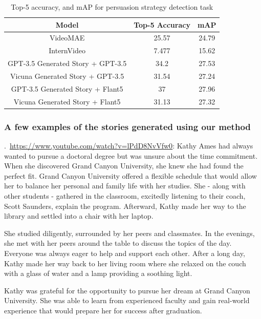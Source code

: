 \documentclass[hidelinks,11pt,a4paper]{report}
\begin{document}
\begin{table}[!h]
\centering
\begin{adjustbox}{max width=0.8\textwidth}
\begin{tabular}{ccc}
\toprule
Model & Top-5 Accuracy & mAP \\
\midrule
VideoMAE & 25.57 & 24.79 \\
InternVideo & 7.477 & 15.62 \\
GPT-3.5 Generated Story + GPT-3.5 & 34.2 & 27.53 \\
Vicuna Generated Story + GPT-3.5 & 31.54 & 27.24 \\
GPT-3.5 Generated Story + Flant5 & 37 & 27.96 \\
Vicuna Generated Story + Flant5 & 31.13 & 27.32 \\
\bottomrule
\end{tabular}
\end{adjustbox}
\caption{Top-5 accuracy, and mAP for persuasion strategy detection task}
\end{table}





\subsubsection{A few examples of the stories generated using our method}
\label{sec:examples-stories-generated}
    .~\url{https://www.youtube.com/watch?v=lPdD8NvVfw0}: 
    Kathy Ames had always wanted to pursue a doctoral degree but was unsure about the time commitment. When she discovered Grand Canyon University, she knew she had found the perfect fit. Grand Canyon University offered a flexible schedule that would allow her to balance her personal and family life with her studies. She - along with other students - gathered in the classroom, excitedly listening to their coach, Scott Saunders, explain the program. Afterward, Kathy made her way to the library and settled into a chair with her laptop. 
    
    She studied diligently, surrounded by her peers and classmates. In the evenings, she met with her peers around the table to discuss the topics of the day. Everyone was always eager to help and support each other. After a long day, Kathy made her way back to her living room where she relaxed on the couch with a glass of water and a lamp providing a soothing light. 
    
    Kathy was grateful for the opportunity to pursue her dream at Grand Canyon University. She was able to learn from experienced faculty and gain real-world experience that would prepare her for success after graduation. 
    
\end{document}
